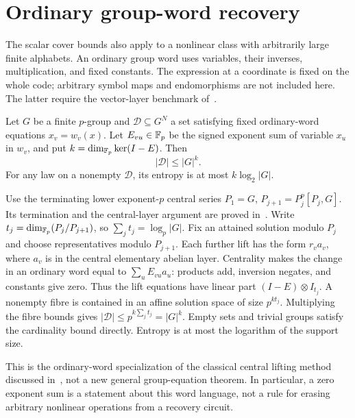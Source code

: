 \section{Ordinary group-word recovery}\label{sec:group-words}

The scalar cover bounds also apply to a nonlinear class with arbitrarily
large finite alphabets. An ordinary group word uses variables, their
inverses, multiplication, and fixed constants. The expression at a
coordinate is fixed on the whole code; arbitrary symbol maps and
endomorphisms are not included here. The latter require the vector-layer
benchmark of~\cite[Theorem B.5]{BrendeDirected}.

\begin{lemma}\label{lem:word-check}
\notformalized
Let $G$ be a finite $p$-group and $\mathcal D\subseteq G^N$ a set
satisfying fixed ordinary-word equations $x_v=w_v(x)$.
Let $E_{vu}\in\mathbb{F}_p$ be the signed exponent sum of variable $x_u$
in $w_v$, and put $k=\dim_{\mathbb{F}_p}\ker(I-E)$. Then
\[
 |\mathcal D|\le |G|^k.
\]
For any law on a nonempty $\mathcal D$, its entropy is at most
$k\log_2|G|$.
\end{lemma}
\begin{informalproof}
Use the terminating lower exponent-$p$ central series
$P_1=G$, $P_{j+1}=P_j^p[P_j,G]$. Its termination and the central-layer
argument are proved in~\cite[Theorem B.5]{BrendeDirected}.
Write $t_j=\dim_{\mathbb{F}_p}(P_j/P_{j+1})$, so
$\sum_jt_j=\log_p|G|$. Fix an attained solution modulo $P_j$ and
choose representatives modulo $P_{j+1}$. Each further lift has the
form $r_va_v$, where $a_v$ is in the central elementary abelian layer.
Centrality makes the change in an ordinary word equal to
$\sum_u E_{vu}a_u$: products add, inversion negates, and constants
give zero. Thus the lift equations have linear part
$(I-E)\otimes I_{t_j}$. A nonempty fibre is contained in an affine
solution space of size $p^{kt_j}$. Multiplying the fibre bounds gives
$|\mathcal D|\le p^{k\sum_jt_j}=|G|^k$. Empty sets and trivial groups
satisfy the cardinality bound directly. Entropy is at most the
logarithm of the support size.
\end{informalproof}

This is the ordinary-word specialization of the classical central
lifting method discussed in~\cite{BrendeDirected}, not a new general
group-equation theorem. In particular, a zero exponent sum is a
statement about this word language, not a rule for erasing arbitrary
nonlinear operations from a recovery circuit.

